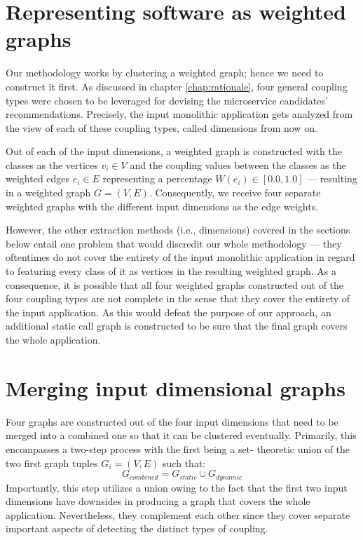 \documentclass[12pt,a4paper]{report}
\begin{document}
\section{Representing software as weighted graphs} \label{sect:software-as-weighted-graph}

Our methodology works by clustering a weighted graph; hence we need to
construct it first. As discussed in chapter \ref{chap:rationale}, four general
coupling types were chosen to be leveraged for devising the microservice
candidates' recommendations. Precisely, the input monolithic application gets
analyzed from the view of each of these coupling types, called dimensions from
now on.

Out of each of the input dimensions, a weighted graph is constructed with the
classes as the vertices \(v_i \in V\) and the coupling values between the
classes as the weighted edges \(e_i \in E\) representing a percentage \(W(e_i)
\in [0.0, 1.0]\) --- resulting in a weighted graph \(G = (V, E)\).
Consequently, we receive four separate weighted graphs with the different
input dimensions as the edge weights.

However, the other extraction methods (i.e., dimensions) covered in the
sections below entail one problem that would discredit our whole
methodology --- they oftentimes do not cover the entirety of the input
monolithic application in regard to featuring every class of it as vertices in
the resulting weighted graph. As a consequence, it is possible that all four
weighted graphs constructed out of the four coupling types are not complete in
the sense that they cover the entirety of the input application. As this would
defeat the purpose of our approach, an additional static call graph is
constructed to be sure that the final graph covers the whole application.



\section{Merging input dimensional graphs} \label{sect:merging-graphs}

Four graphs are constructed out of the four input dimensions that need
to be merged into a combined one so that it can be clustered eventually.
Primarily, this encompasses a two-step process with the first being a set-
theoretic union of the two first graph tuples \(G_i = (V, E)\) such that:
\[
  G_{combined} = G_{static} \cup G_{dynamic}
\]
Importantly, this step utilizes a
union owing to the fact that the first two input dimensions have downsides in
producing a graph that covers the whole application. Nevertheless, they
complement each other since they cover separate important aspects of detecting
the distinct types of coupling.
\end{document}
